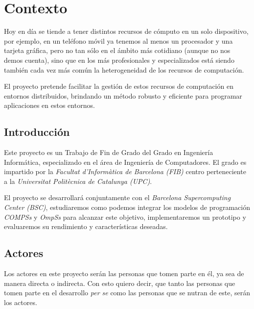 \section{Contexto}

Hoy en día se tiende a tener distintos recursos de cómputo en un solo dispositivo, por ejemplo, en un teléfono móvil ya tenemos al menos un procesador y una tarjeta gráfica, pero no tan sólo en el ámbito más cotidiano (aunque no nos demos cuenta), sino que en los más profesionales y especializados está siendo también cada vez más común la heterogeneidad de los recursos de computación. 
\par\bigskip

El proyecto pretende facilitar la gestión de estos recursos de computación en entornos distribuidos, brindando un método robusto y eficiente para programar aplicaciones en estos entornos.


\subsection{Introducción}

Este proyecto es un Trabajo de Fin de Grado del Grado en Ingeniería Informática, especializado en el área de Ingeniería de Computadores. El grado es impartido por la \textit{Facultat d'Informàtica de Barcelona (FIB)} centro perteneciente a la \textit{Universitat Politècnica de Catalunya (UPC)}. 
\par\bigskip

El proyecto se desarrollará conjuntamente con el \textit{Barcelona Supercomputing Center (BSC)}, estudiaremos como podemos integrar los modelos de programación \textit{COMPSs} y \textit{OmpSs} para alcanzar este objetivo, implementaremos un prototipo y evaluaremos su rendimiento y características deseadas. 

\subsection{Actores}

Los actores en este proyecto serán las personas que tomen parte en él, ya sea de manera directa o indirecta. Con esto quiero decir, que tanto las personas que tomen parte en el desarrollo \textit{per se} como las personas que se nutran de este, serán los actores.

